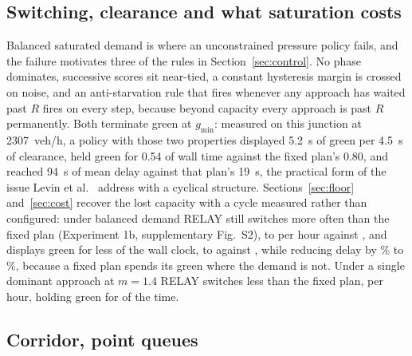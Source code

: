 \documentclass[journal]{IEEEtran}
\newcommand{\relay}{RELAY}
\begin{document}
\subsection{Switching, clearance and what saturation costs}
\label{sec:switching}

Balanced saturated demand is where an unconstrained pressure policy fails, and the failure motivates three of
the rules in Section~\ref{sec:control}. No phase dominates, successive scores sit near-tied, a constant
hysteresis margin is crossed on noise, and an anti-starvation rule that fires whenever any approach has
waited past $R$ fires on every step, because beyond capacity every approach is past $R$ permanently. Both
terminate green at $g_{\min}$: measured on this junction at 2307~veh/h, a policy with those two properties
displayed 5.2~s of green per 4.5~s of clearance, held green for 0.54 of wall time against the fixed plan's
0.80, and reached 94~s of mean delay against that plan's 19~s, the practical form of the issue Levin et
al.~\cite{Levin2020CyclicalMaxPressure} address with a cyclical structure. Sections~\ref{sec:floor}
and~\ref{sec:cost} recover the lost capacity with a cycle measured rather than configured: under balanced
demand \relay{} still switches more often than the fixed plan (Experiment 1b, supplementary Fig.~S2),
\SwitchBalMin{} to \SwitchBalMax{} per hour against \SwitchFixed, and displays green for less of the wall
clock, \GreenFracBalMin{} to \GreenFracBalMax{} against \GreenFracFixed, while reducing delay by
\BalRedWebsterMin\% to \BalRedWebsterMax\%, because a fixed plan spends its green where the demand is not.
Under a single dominant approach at $m = 1.4$ \relay{} switches less than the fixed plan, \SwitchSinHigh{}
per hour, holding green for \GreenFracSinHigh{} of the time.

\subsection{Corridor, point queues}
\end{document}
